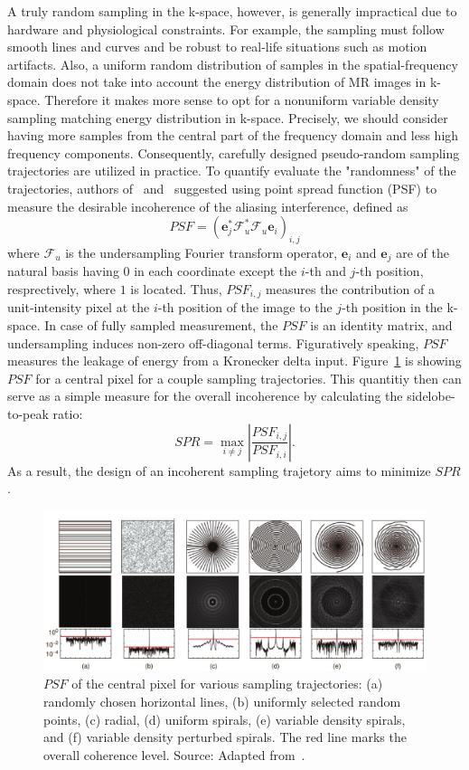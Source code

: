 A truly random sampling in the k-space, however, is generally impractical due to hardware and physiological constraints. For example, the sampling must follow smooth lines and curves and be robust to real-life situations such as motion artifacts. Also, a uniform random distribution of samples in the spatial-frequency domain does not take into account the energy distribution of MR images in k-space. Therefore it makes more sense to opt for a nonuniform variable density sampling matching energy distribution in k-space. Precisely, we should consider having more samples from the central part of the frequency domain and less high frequency components. Consequently, carefully designed pseudo-random sampling trajectories are utilized in practice. To quantify  evaluate the "randomness" of the trajectories, authors of~\cite{lustig_compressed_2008} and~\cite{lustig_sparse_2007} suggested using point spread function (PSF) to measure the desirable incoherence of the aliasing interference, defined as
\[PSF = (\mathbf{e}_j^* \mathcal{F}_u^* \mathcal{F}_u \mathbf{e}_i)_{i,j}\]
where $\mathcal{F}_u$ is the undersampling Fourier transform operator, $\mathbf{e}_i$ and $\mathbf{e}_j$ are of the natural basis having $0$ in each coordinate except the $i$-th and $j$-th position, resprectively, where $1$ is located. Thus, $PSF_{i,j}$ measures the contribution of a unit-intensity pixel at the $i$-th position of the image to the $j$-th position in the k-space. In case of fully sampled measurement, the $PSF$ is an identity matrix, and undersampling induces non-zero off-diagonal terms. Figuratively speaking, $PSF$ measures the leakage of energy from a Kronecker delta input. Figure~\ref{fig:trajectory_coherence} is showing $PSF$ for a central pixel for a couple sampling trajectories. This quantitiy then can serve as a simple measure for the overall incoherence by calculating the sidelobe-to-peak ratio:
\[SPR = \max_{i \ne j} \left|\frac{PSF_{i,j}}{PSF_{i,i}}\right|.\]
As a result, the design of an incoherent sampling trajetory aims to minimize $SPR$.

\begin{figure}
    \centering
    \includegraphics[width=\linewidth]{images/PSF_trajectories.png}
    \caption{$PSF$ of the central pixel for various sampling trajectories: (a) randomly chosen horizontal lines, (b) uniformly selected random points, (c) radial, (d) uniform spirals, (e) variable density spirals, and (f) variable density perturbed spirals. The red line marks the overall coherence level. Source: Adapted from~\cite{lustig_compressed_2008}.}
    \label{fig:trajectory_coherence}
\end{figure}

